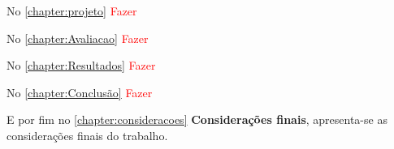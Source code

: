 \par
No \autoref{chapter:projeto} \textcolor{red}{Fazer}

\par
No \autoref{chapter:Avaliacao} \textcolor{red}{Fazer} 

\par
No \autoref{chapter:Resultados} \textcolor{red}{Fazer}

\par
No \autoref{chapter:Conclusão} \textcolor{red}{Fazer}

\par
E por fim no \autoref{chapter:consideracoes} \textbf{Considerações finais}, apresenta-se as considerações finais do trabalho. 
